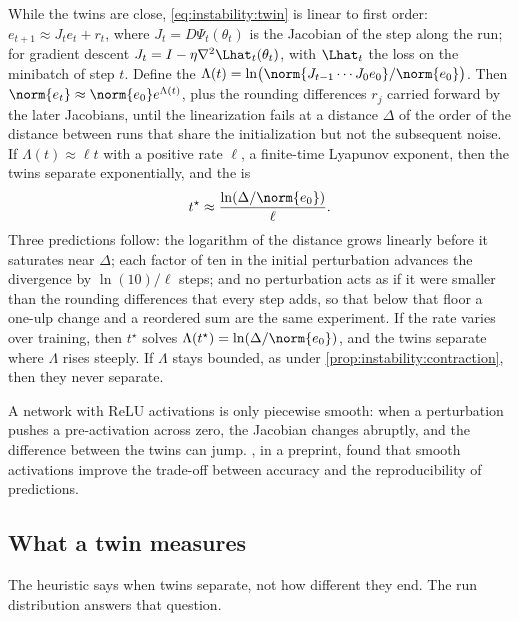 \begin{refsection}
\begin{heuristic}
While the twins are close, \eqref{eq:instability:twin} is linear to first order: $e_{t+1}\approx J_te_t+r_t$, where $J_t=D\Psi_t(\theta_t)$ is the Jacobian of the step along the run; for gradient descent $J_t=I-\eta\nabla^2\Lhat_t(\theta_t)$, with $\Lhat_t$ the loss on the minibatch of step $t$. Define the  $\Lambda(t)=\ln\bigl(\norm{J_{t-1}\cdots J_0e_0}/\norm{e_0}\bigr)$. Then $\norm{e_t}\approx\norm{e_0}e^{\Lambda(t)}$, plus the rounding differences $r_j$ carried forward by the later Jacobians, until the linearization fails at a distance $\Delta$ of the order of the distance between runs that share the initialization but not the subsequent noise. If $\Lambda(t)\approx\ell t$ with a positive rate $\ell$, a finite-time Lyapunov exponent, then the twins separate exponentially, and the  is
\[
  t^\star\approx\frac{\ln(\Delta/\norm{e_0})}{\ell} .
\]
Three predictions follow: the logarithm of the distance grows linearly before it saturates near $\Delta$; each factor of ten in the initial perturbation advances the divergence by $\ln(10)/\ell$ steps; and no perturbation acts as if it were smaller than the rounding differences that every step adds, so that below that floor a one-ulp change and a reordered sum are the same experiment. If the rate varies over training, then $t^\star$ solves $\Lambda(t^\star)=\ln(\Delta/\norm{e_0})$, and the twins separate where $\Lambda$ rises steeply. If $\Lambda$ stays bounded, as under \cref{prop:instability:contraction}, then they never separate.
\end{heuristic}

A network with ReLU activations is only piecewise smooth: when a perturbation pushes a pre-activation across zero, the Jacobian changes abruptly, and the difference between the twins can jump. \Textcite{ShamirEtAl2020}, in a preprint, found that smooth activations improve the trade-off between accuracy and the reproducibility of predictions.

\subsection{What a twin measures}

The heuristic says when twins separate, not how different they end. The run distribution answers that question.


\end{refsection}
